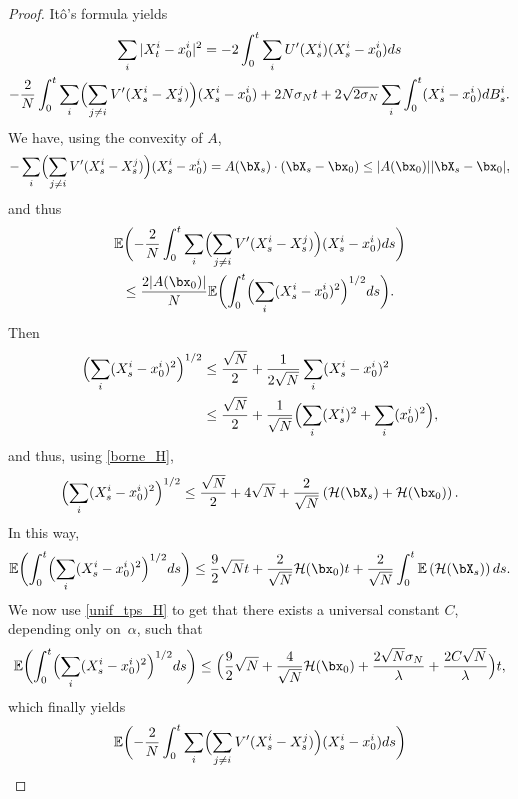 \begin{proof}
Itô's formula yields
\begin{multline}
\sum_{i}|X^i_t-x^i_0|^2=-2\int_0^t\sum_iU'(X^i_s)(X^i_s-x^i_0)ds\\
-\frac{2}{N}\int_0^t\sum_i\Bigl(\sum_{j\neq i}V'(X^i_s-X^j_s)\Bigr)(X^i_s-x^i_0)+2N\sigma_Nt+2\sqrt{2\sigma_N}\sum_i\int_0^t(X^i_s-x^i_0)dB^i_s\label{int_lemme_cont}.
\end{multline}
We have, using the convexity of $A$,
\begin{align*}
-\sum_i\Bigl(\sum_{j\neq i}V'(X^i_s-X^j_s)\Bigr)(X^i_s-x^i_0)=A(\bX_s)\cdot(\bX_s-\bx_0)\leq |A(\bx_0)||\bX_s-\bx_0|,
\end{align*}
and thus
\begin{multline*}
\mathbb{E}\biggl(-\frac{2}{N}\int_0^t\sum_i\Bigl(\sum_{j\neq i}V'(X^i_s-X^j_s)\Bigr)(X^i_s-x^i_0)ds\biggr)\\
\leq\frac{2|A(\bx_0)|}{N}\mathbb{E}\biggl(\int_0^t\Bigl(\sum_i(X^i_s-x^i_0)^2\Bigr)^{1/2}ds\biggr).
\end{multline*}
Then
\begin{align*}
\Bigl(\sum_i(X^i_s-x^i_0)^2\Bigr)^{1/2}&\leq\frac{\sqrt{N}}{2}+\frac{1}{2\sqrt{N}}\sum_i(X^i_s-x^i_0)^2\\
&\leq\frac{\sqrt{N}}{2}+\frac{1}{\sqrt{N}}\Bigl(\sum_i(X^i_s)^2+\sum_i(x^i_0)^2\Bigr),
\end{align*}
and thus, using \eqref{borne_H},
\begin{align*}
\Bigl(\sum_i(X^i_s-x^i_0)^2\Bigr)^{1/2}\leq\frac{\sqrt{N}}{2}+4\sqrt{N}+\frac{2}{\sqrt{N}}\left(\mathcal{H}(\bX_s)+\mathcal{H}(\bx_0)\right).
\end{align*}
In this way,
\begin{align*}
\mathbb{E}\biggl(\int_0^t\Bigl(\sum_i(X^i_s-x^i_0)^2\Bigr)^{1/2}ds\biggr)\leq \frac{9}{2}\sqrt{N}t+\frac{2}{\sqrt{N}}\mathcal{H}(\bx_0)t+\frac{2}{\sqrt{N}}\int_0^t\mathbb{E}\left(\mathcal{H}(\bX_s)\right)ds.
\end{align*}
We now use \eqref{unif_tps_H} to get that there exists a universal constant $C$, depending only on~$\alpha$, such that
\begin{align*}
\mathbb{E}\biggl(\int_0^t\Bigl(\sum_i(X^i_s-x^i_0)^2\Bigr)^{1/2}ds\biggr)\leq \Bigl(\frac{9}{2}\sqrt{N}+\frac{4}{\sqrt{N}}\mathcal{H}(\bx_0)+\frac{2\sqrt{N}\sigma_N}{\lambda}+\frac{2C\sqrt{N}}{\lambda}\Bigr)t,
\end{align*}
which finally yields
\begin{multline*}
\mathbb{E}\biggl(-\frac{2}{N}\int_0^t\sum_i\Bigl(\sum_{j\neq i}V'(X^i_s-X^j_s)\Bigr)(X^i_s-x^i_0)ds\biggr)\\

\end{multline*}
\end{proof}
